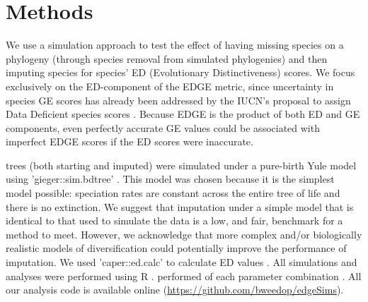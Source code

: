 \documentclass[10pt,english]{article}
\begin{document}
\section*{Methods}

We use a simulation approach to test the effect of having missing species
on a phylogeny (through species removal from simulated phylogenies) and then
imputing species for species’ ED (Evolutionary Distinctiveness) scores. We focus
exclusively on the ED-component of the EDGE metric, since uncertainty in species
GE scores has already been addressed by the IUCN’s proposal to assign Data
Deficient species scores \autocite{Iucn2001, Iucn2008}. Because EDGE is the
product of both ED and GE components, even perfectly accurate GE values could be
associated with imperfect EDGE scores if the ED scores were inaccurate.

 trees (both starting and
imputed) were simulated under a pure-birth Yule model using 'gieger::sim.bdtree'
\autocite[setting parameters \texttt{b=1} and \texttt{d=0};][]{Pennell2014}.
This model was chosen because it is the simplest model possible: speciation
rates are constant across the entire tree of life and there is no extinction. We
suggest that imputation under a simple model that is identical to that used to
simulate the data is a low, and fair, benchmark for a method to meet. However,
we acknowledge that more complex and/or biologically realistic models of
diversification could potentially improve the performance of imputation.
 We used
'caper::ed.calc' to calculate ED values \autocite{Orme2013}. All simulations and
analyses were performed using R \autocite[version 3.4.0;][]{R2017}.
 performed  of each parameter combination . All our
analysis code is available online (\url{https://github.com/bweedop/edgeSims}).
\end{document}
